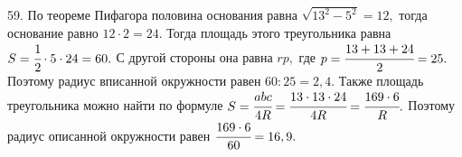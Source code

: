 59. По теореме Пифагора половина основания равна $\sqrt{13^2-5^2}=12,$ тогда основание равно $12\cdot2=24.$ Тогда площадь этого треугольника равна $S=\cfrac{1}{2}\cdot5\cdot24=60.$ С другой стороны она равна $rp,$ где $p=\cfrac{13+13+24}{2}=25.$ Поэтому радиус вписанной окружности равен $60:25=2,4.$ Также площадь треугольника можно найти по формуле $S=\cfrac{abc}{4R}=\cfrac{13\cdot13\cdot24}{4R}=\cfrac{169\cdot6}{R}.$ Поэтому радиус описанной окружности равен $\cfrac{169\cdot6}{60}=16,9.$\newpage\noindent
